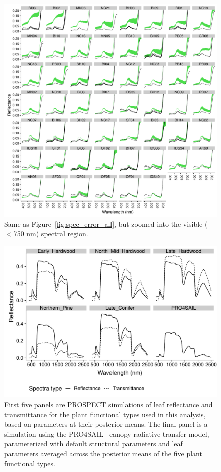 \begin{figure}
  \centering
  \includegraphics[width=\textwidth]{4_edr/figures/explore_spectra/errors_byvis_vis.pdf}
  \caption{%
    Same as Figure~\ref{fig:spec_error_all}, but zoomed into the visible ($<$750 nm) spectral region.
  }\label{fig:spec_error_vis}
\end{figure}

\begin{figure}
  \centering
  \includegraphics[width=\textwidth]{4_edr/figures/explore_spectra/pft_prospect_sim.pdf}
  \caption{%
    First five panels are PROSPECT simulations of leaf reflectance and transmittance for the plant functional types used in this analysis, based on parameters at their posterior means.
    The final panel is a simulation using the PRO4SAIL~\cite{verhoef_1984_sail} canopy radiative transfer model, parameterized with default structural parameters and leaf parameters averaged across the posterior means of the five plant functional types.
  }\label{fig:prospect_posterior}
\end{figure}

